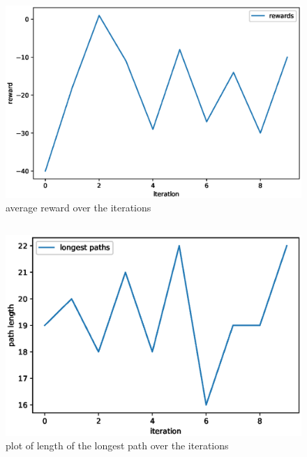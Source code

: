 \documentclass[11pt,a4paper]{article}
\begin{document}
\newpage

\section{}

\subsection{}
\begin{figure}[!h]
  \includegraphics[width=.7\textwidth]{reward.eps}
  \centering
  \caption{average reward over the iterations}
  \label{fig1}
\end{figure}

\subsection{}

\begin{figure}[h!]
  \includegraphics[width=.7\textwidth]{path_length.eps}
  \centering
  \caption{plot of length of the longest path over the iterations}
  \label{fig2}
\end{figure}
\end{document}
